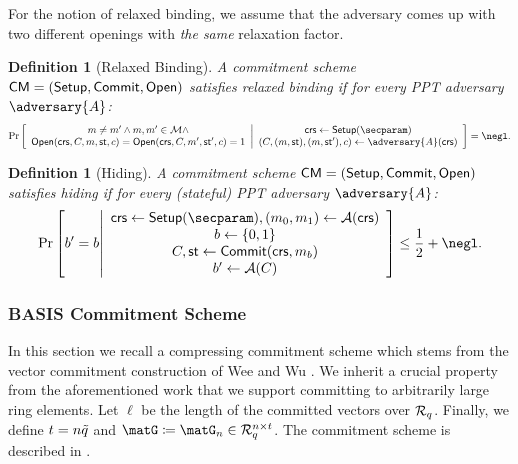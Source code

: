 \documentclass[11pt,letterpaper]{article}
\newcounter{theo}[section]
\newtheorem{definition}[theorem]{Definition}
\theoremstyle{definition} %
\newcommand{\from}{\gets}
\begin{document}
\noindent For the notion of relaxed binding, we assume that the adversary comes up with two different openings with \textit{the same} relaxation factor.
\begin{definition}[Relaxed Binding]
     A commitment scheme $\mathsf{CM} = (\mathsf{Setup}, \mathsf{Commit}, \mathsf{Open})$ satisfies relaxed binding if for every PPT adversary $\adversary{A}$:
      \begin{equation*}
      \scalemath{0.95}{
        \Pr\left[
          \begin{array}{c}
            m \neq m' \land m,m' \in \commitmentSpace \land \\
            \open(\crs, C, m, \polystate, c) = \open(\crs, C, m', \polystate', c) = 1
          \end{array}
        \middle|
          \begin{array}{c}
            \crs \from \setup(\secparam) \\
            (C, (m, \polystate), (m, \polystate'), c) \from \adversary{A}(\crs) \\
          \end{array}
        \right] = \negl.}
      \end{equation*}

\end{definition}
\begin{definition}[Hiding] A commitment scheme $\mathsf{CM} = (\mathsf{Setup}, \mathsf{Commit}, \mathsf{Open})$ satisfies hiding if for every (stateful) PPT adversary $\adversary{A}$:
      \begin{equation*}
        \Pr\left[
          b' = b
          \middle|
          \begin{array}{c}
            \crs \from \setup(\secparam), (m_0,m_1) \from \Adversary(\crs) \\
            b \from \{0,1\} \\
            C, \commitmentState \from \commit(\crs, m_b) \\
            b' \from \Adversary(C)
          \end{array}
        \right] \leq \frac{1}{2} + \negl.
      \end{equation*}
\end{definition}
\subsubsection{BASIS Commitment Scheme}
In this section we recall a compressing commitment scheme which stems from the vector commitment construction of Wee and Wu \cite{WeeWu23}. We inherit a crucial property from the aforementioned work that we support committing to arbitrarily large ring elements. Let $\ell$ be the length of the committed vectors over $\mathcal{R}_q$.  Finally, we define $t = n{\tilde{q}}$ and $\matG \coloneqq  \matG_n \in \Rq^{n \times t}$. The commitment scheme is described in .
\end{document}
